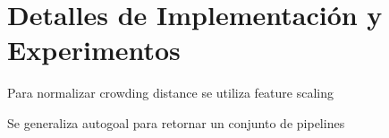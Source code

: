 \chapter{Detalles de Implementación y Experimentos}\label{chapter:implementation}

Para normalizar crowding distance se utiliza feature scaling

Se generaliza autogoal para retornar un conjunto de pipelines


